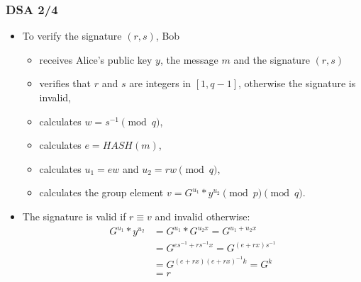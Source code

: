 \documentclass{beamer}
\begin{document}
\begin{frame}
  \frametitle{DSA 2/4}
  \begin{itemize}
  \item To verify the signature $(r, s)$, Bob
    \begin{itemize}
    \item receives Alice's public key $y$, the message $m$ and the signature $(r, s)$
    \item verifies that $r$ and $s$ are integers in $[1, q - 1]$, otherwise the
      signature is invalid,
    \item calculates $w = s^{-1} \pmod{q}$,
    \item calculates $e = HASH(m)$,
    \item calculates $u_1 = ew$ and $u_2 = rw \pmod{q}$,
    \item calculates the group element $v = G^{u_1} * y^{u_2} \pmod{p} \pmod{q}$.
    \end{itemize}
  \item The signature is valid if $r \equiv v$ and invalid otherwise:
    \begin{align*}
      G^{u_1} * y^{u_2} &= G^{u_1} * G^{u_2x} = G^{u_1 + u_2x} \\
                  &= G^{es^{-1} + rs^{-1}x} = G^{(e + rx)s^{-1}} \\
                  &= G^{(e + rx)(e + rx)^{-1}k} = G^k \\
                  &= r
    \end{align*}
  \end{itemize}
\end{frame}
\end{document}
